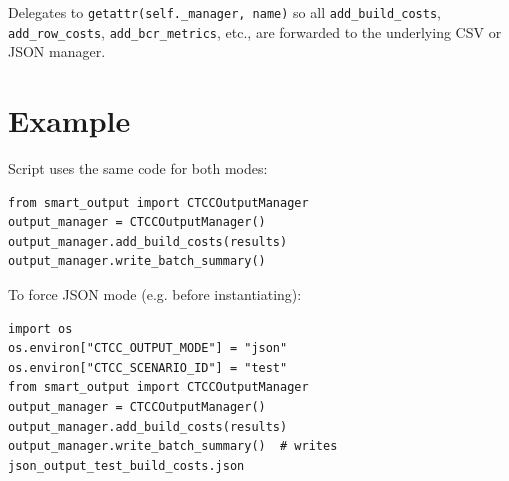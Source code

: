 \documentclass[ctcc_full_documentation.tex]{subfiles}
\begin{document}
Delegates to \texttt{getattr(self.\_manager, name)} so all \texttt{add\_build\_costs}, \texttt{add\_row\_costs}, \texttt{add\_bcr\_metrics}, etc., are forwarded to the underlying CSV or JSON manager.

\section{Example}

Script uses the same code for both modes:
\begin{lstlisting}
from smart_output import CTCCOutputManager
output_manager = CTCCOutputManager()
output_manager.add_build_costs(results)
output_manager.write_batch_summary()
\end{lstlisting}

To force JSON mode (e.g. before instantiating):
\begin{lstlisting}
import os
os.environ["CTCC_OUTPUT_MODE"] = "json"
os.environ["CTCC_SCENARIO_ID"] = "test"
from smart_output import CTCCOutputManager
output_manager = CTCCOutputManager()
output_manager.add_build_costs(results)
output_manager.write_batch_summary()  # writes json_output_test_build_costs.json
\end{lstlisting}
\end{document}
